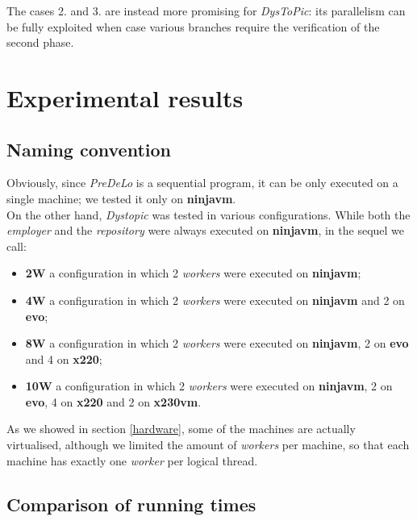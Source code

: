 \documentclass[a4paper, 11pt, oneside]{duthesis}
\begin{document}
The cases 2. and 3. are instead more promising for \emph{DysToPic}: its parallelism can be fully exploited when case various branches require the verification of the second phase.

\newpage

\section{Experimental results}

\subsection{Naming convention}

Obviously, since \emph{PreDeLo} is a sequential program, it can be only executed on a single machine; we tested it only on \textbf{ninjavm}.\\

On the other hand, \emph{Dystopic} was tested in various configurations.
While both the \emph{employer} and the \emph{repository} were always executed on \textbf{ninjavm}, in the sequel we call:

\begin{itemize}

\item \textbf{2W} a configuration in which 2 \emph{workers} were executed on \textbf{ninjavm};
\item \textbf{4W} a configuration in which 2 \emph{workers} were executed on \textbf{ninjavm} and 2 on \textbf{evo};
\item \textbf{8W} a configuration in which 2 \emph{workers} were executed on \textbf{ninjavm}, 2 on \textbf{evo} and 4 on \textbf{x220};
\item \textbf{10W} a configuration in which 2 \emph{workers} were executed on \textbf{ninjavm}, 2 on \textbf{evo}, 4 on \textbf{x220} and 2 on \textbf{x230vm}.

\end{itemize}

As we showed in section \ref{hardware}, some of the machines are actually virtualised, although we limited the amount of \emph{workers} per machine, so that each machine has exactly one \emph{worker} per logical thread.

\newpage


\subsection{Comparison of running times}
\end{document}
